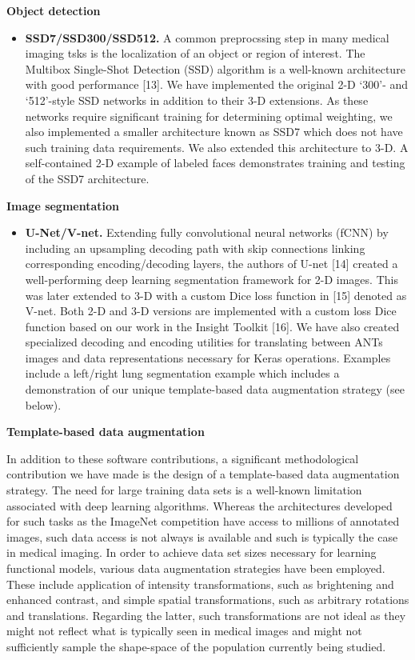 \documentclass[11pt,]{article}
\providecommand{\tightlist}{%
  \setlength{\itemsep}{0pt}\setlength{\parskip}{0pt}}
\begin{document}
\textbf{Object detection}

\begin{itemize}
\tightlist
\item
  \textbf{SSD7/SSD300/SSD512.} A common preprocssing step in many
  medical imaging tsks is the localization of an object or region of
  interest. The Multibox Single-Shot Detection (SSD) algorithm is a
  well-known architecture with good performance {[}13{]}. We have
  implemented the original 2-D `300'- and `512'-style SSD networks in
  addition to their 3-D extensions. As these networks require
  significant training for determining optimal weighting, we also
  implemented a smaller architecture known as SSD7 which does not have
  such training data requirements. We also extended this architecture to
  3-D. A self-contained 2-D example of labeled faces demonstrates
  training and testing of the SSD7 architecture.
\end{itemize}

\textbf{Image segmentation}

\begin{itemize}
\tightlist
\item
  \textbf{U-Net/V-net.} Extending fully convolutional neural networks
  (fCNN) by including an upsampling decoding path with skip connections
  linking corresponding encoding/decoding layers, the authors of U-net
  {[}14{]} created a well-performing deep learning segmentation
  framework for 2-D images. This was later extended to 3-D with a custom
  Dice loss function in {[}15{]} denoted as V-net. Both 2-D and 3-D
  versions are implemented with a custom loss Dice function based on our
  work in the Insight Toolkit {[}16{]}. We have also created specialized
  decoding and encoding utilities for translating between ANTs images
  and data representations necessary for Keras operations. Examples
  include a left/right lung segmentation example which includes a
  demonstration of our unique template-based data augmentation strategy
  (see below).
\end{itemize}

\textbf{Template-based data augmentation}

In addition to these software contributions, a significant
methodological contribution we have made is the design of a
template-based data augmentation strategy. The need for large training
data sets is a well-known limitation associated with deep learning
algorithms. Whereas the architectures developed for such tasks as the
ImageNet competition have access to millions of annotated images, such
data access is not always is available and such is typically the case in
medical imaging. In order to achieve data set sizes necessary for
learning functional models, various data augmentation strategies have
been employed. These include application of intensity transformations,
such as brightening and enhanced contrast, and simple spatial
transformations, such as arbitrary rotations and translations. Regarding
the latter, such transformations are not ideal as they might not reflect
what is typically seen in medical images and might not sufficiently
sample the shape-space of the population currently being studied.
\end{document}
